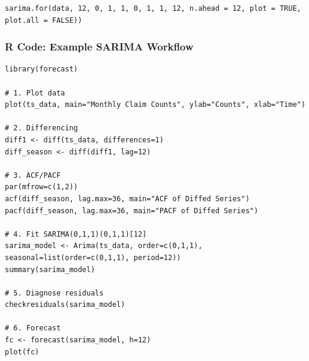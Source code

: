 \documentclass{article}
\begin{document}
\begin{lstlisting}
sarima.for(data, 12, 0, 1, 1, 0, 1, 1, 12, n.ahead = 12, plot = TRUE, plot.all = FALSE))
\end{lstlisting}



\subsubsection*{R Code: Example SARIMA Workflow}
\begin{lstlisting}
library(forecast)

# 1. Plot data
plot(ts_data, main="Monthly Claim Counts", ylab="Counts", xlab="Time")

# 2. Differencing
diff1 <- diff(ts_data, differences=1)
diff_season <- diff(diff1, lag=12)

# 3. ACF/PACF
par(mfrow=c(1,2))
acf(diff_season, lag.max=36, main="ACF of Diffed Series")
pacf(diff_season, lag.max=36, main="PACF of Diffed Series")

# 4. Fit SARIMA(0,1,1)(0,1,1)[12]
sarima_model <- Arima(ts_data, order=c(0,1,1), seasonal=list(order=c(0,1,1), period=12))
summary(sarima_model)

# 5. Diagnose residuals
checkresiduals(sarima_model)

# 6. Forecast
fc <- forecast(sarima_model, h=12)
plot(fc)
\end{lstlisting}



\pagebreak
\end{document}
